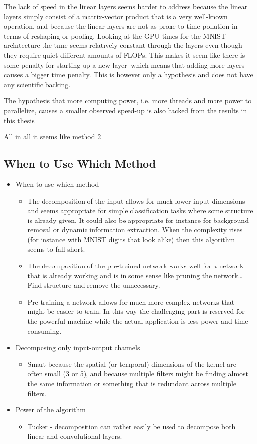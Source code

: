 The lack of speed in the linear layers seems harder to address because the linear layers simply consist of a matrix-vector product that is a very well-known operation, and because the linear layers are not as prone to time-pollution in terms of reshaping or pooling. Looking at the GPU times for the MNIST architecture the time seems relatively constant through the layers even though they require quiet different amounts of FLOPs. This makes it seem like there is some penalty for starting up a new layer, which means that adding more layers causes a bigger time penalty. This is however only a hypothesis and does not have any scientific backing.

The hypothesis that more computing power, i.e. more threads and more power to parallelize, causes a smaller observed speed-up is also backed from the results in this thesis

All in all it seems like method 2

\subsection{When to Use Which Method}


\begin{itemize}
    \item When to use which method
    \begin{itemize}
        \item The decomposition of the input allows for much lower input dimensions and seems appropriate for simple classification tasks where some structure is already given. It could also be appropriate for instance for background removal or dynamic information extraction. When the complexity rises (for instance with MNIST digits that look alike) then this algorithm seems to fall short.
        \item The decomposition of the pre-trained network works well for a network that is already working and is in some sense like pruning the network… Find structure and remove the unnecessary. 
        \item Pre-training a network allows for much more complex networks that might be easier to train. In this way the challenging part is reserved for the powerful machine while the actual application is less power and time consuming.
    \end{itemize}
    \item Decomposing only input-output channels
    \begin{itemize}
        \item  Smart because the spatial (or temporal) dimensions of the kernel are often small (3 or 5), and because multiple filters might be finding almost the same information or something that is redundant across multiple filters.
    \end{itemize}
    \item Power of the algorithm
    \begin{itemize}
        \item Tucker - decomposition can rather easily be used to decompose both linear and convolutional layers. 
    \end{itemize}
\end{itemize}

